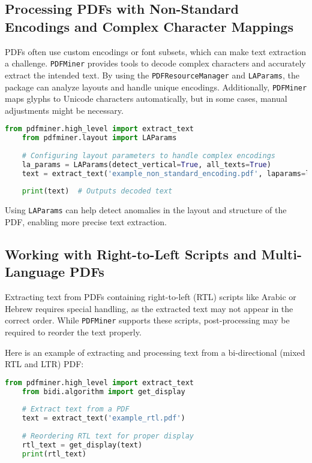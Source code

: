 \subsection{Processing PDFs with Non-Standard Encodings and Complex Character Mappings}

PDFs often use custom encodings or font subsets, which can make text extraction a challenge. \texttt{PDFMiner} provides tools to decode complex characters and accurately extract the intended text. By using the \texttt{PDFResourceManager} and \texttt{LAParams}, the package can analyze layouts and handle unique encodings. Additionally, \texttt{PDFMiner} maps glyphs to Unicode characters automatically, but in some cases, manual adjustments might be necessary.\\


\begin{lstlisting}[language=Python, caption=Extracting Text from PDFs with Non-Standard Encodings]
	from pdfminer.high_level import extract_text
	from pdfminer.layout import LAParams
	
	# Configuring layout parameters to handle complex encodings
	la_params = LAParams(detect_vertical=True, all_texts=True)
	text = extract_text('example_non_standard_encoding.pdf', laparams=la_params)
	
	print(text)  # Outputs decoded text
\end{lstlisting}

Using \texttt{LAParams} can help detect anomalies in the layout and structure of the PDF, enabling more precise text extraction.

\subsection {Working with Right-to-Left Scripts and Multi-Language PDFs}

Extracting text from PDFs containing right-to-left (RTL) scripts like Arabic or Hebrew requires special handling, as the extracted text may not appear in the correct order. While \texttt{PDFMiner} supports these scripts, post-processing may be required to reorder the text properly.\cite{Shinyama:2019}

Here is an example of extracting and processing text from a bi-directional (mixed RTL and LTR) PDF:

\begin{lstlisting}[language=Python, caption=Extracting and Reordering RTL Text]
	from pdfminer.high_level import extract_text
	from bidi.algorithm import get_display
	
	# Extract text from a PDF
	text = extract_text('example_rtl.pdf')
	
	# Reordering RTL text for proper display
	rtl_text = get_display(text)
	print(rtl_text)
\end{lstlisting}

